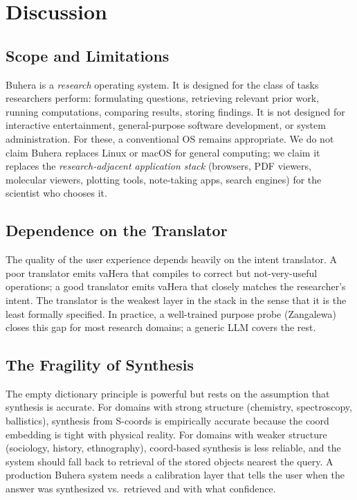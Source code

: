 \documentclass[11pt,twocolumn,a4paper]{article}
\begin{document}
\section{Discussion}
\label{sec:discussion}

\subsection{Scope and Limitations}

Buhera is a \emph{research} operating system. It is designed for the class of tasks researchers perform: formulating questions, retrieving relevant prior work, running computations, comparing results, storing findings. It is not designed for interactive entertainment, general-purpose software development, or system administration. For these, a conventional OS remains appropriate. We do not claim Buhera replaces Linux or macOS for general computing; we claim it replaces the \emph{research-adjacent application stack} (browsers, PDF viewers, molecular viewers, plotting tools, note-taking apps, search engines) for the scientist who chooses it.

\subsection{Dependence on the Translator}

The quality of the user experience depends heavily on the intent translator. A poor translator emits vaHera that compiles to correct but not-very-useful operations; a good translator emits vaHera that closely matches the researcher's intent. The translator is the weakest layer in the stack in the sense that it is the least formally specified. In practice, a well-trained purpose probe (Zangalewa) closes this gap for most research domains; a generic LLM covers the rest.

\subsection{The Fragility of Synthesis}

The empty dictionary principle is powerful but rests on the assumption that synthesis is accurate. For domains with strong structure (chemistry, spectroscopy, ballistics), synthesis from S-coords is empirically accurate because the coord embedding is tight with physical reality. For domains with weaker structure (sociology, history, ethnography), coord-based synthesis is less reliable, and the system should fall back to retrieval of the stored objects nearest the query. A production Buhera system needs a calibration layer that tells the user when the answer was synthesized vs.\ retrieved and with what confidence.
\end{document}
